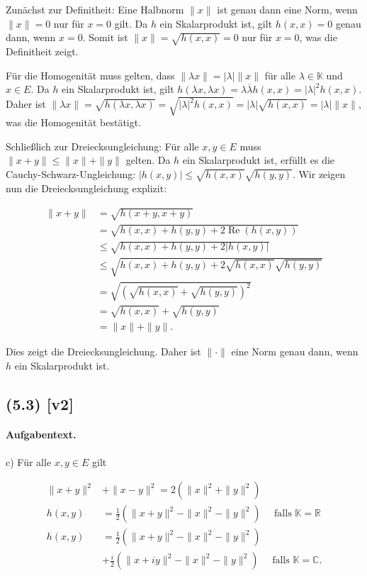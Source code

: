 \documentclass[11pt,a4paper]{article}
\begin{document}
Zunächst zur Definitheit: Eine Halbnorm $\|x\|$ ist genau dann eine Norm, wenn $\|x\| = 0$ nur für $x = 0$ gilt. Da $h$ ein Skalarprodukt ist, gilt $h(x, x) = 0$ genau dann, wenn $x = 0$. Somit ist $\|x\| = \sqrt{h(x, x)} = 0$ nur für $x = 0$, was die Definitheit zeigt.

Für die Homogenität muss gelten, dass $\|\lambda x\| = |\lambda| \|x\|$ für alle $\lambda \in \mathbb{K}$ und $x \in E$. Da $h$ ein Skalarprodukt ist, gilt $h(\lambda x, \lambda x) = \lambda \overline{\lambda} h(x, x) = |\lambda|^2 h(x, x)$. Daher ist $\|\lambda x\| = \sqrt{h(\lambda x, \lambda x)} = \sqrt{|\lambda|^2 h(x, x)} = |\lambda| \sqrt{h(x, x)} = |\lambda| \|x\|$, was die Homogenität bestätigt.

Schließlich zur Dreiecksungleichung: Für alle $x, y \in E$ muss $\|x + y\| \leq \|x\| + \|y\|$ gelten. Da $h$ ein Skalarprodukt ist, erfüllt es die Cauchy-Schwarz-Ungleichung: $|h(x, y)| \leq \sqrt{h(x, x)} \sqrt{h(y, y)}$. Wir zeigen nun die Dreiecksungleichung explizit:

\begin{align*}
\|x+y\| &= \sqrt{h(x+y, x+y)} \\
&= \sqrt{h(x, x) + h(y, y) + 2 \operatorname{Re}(h(x, y))} \\
&\leq \sqrt{h(x, x) + h(y, y) + 2|h(x, y)|} \\
&\leq \sqrt{h(x, x) + h(y, y) + 2\sqrt{h(x, x)}\sqrt{h(y, y)}} \\
&= \sqrt{(\sqrt{h(x, x)} + \sqrt{h(y, y)})^2} \\
&= \sqrt{h(x, x)} + \sqrt{h(y, y)} \\
&= \|x\| + \|y\|.
\end{align*}

Dies zeigt die Dreiecksungleichung. Daher ist $\|\cdot\|$ eine Norm genau dann, wenn $h$ ein Skalarprodukt ist.


\subsection*{(5.3) [v2]}
\paragraph{Aufgabentext.}
c) Für alle $x, y \in E$ gilt

$$
\begin{aligned}
\|x+y\|^2 & +\|x-y\|^2=2\left(\|x\|^2+\|y\|^2\right) \\
h(x, y) & =\frac{1}{2}\left(\|x+y\|^2-\|x\|^2-\|y\|^2\right) \quad \text { falls } \mathbb{K}=\mathbb{R} \\
h(x, y) & =\frac{1}{2}\left(\|x+y\|^2-\|x\|^2-\|y\|^2\right) \\
& +\frac{i}{2}\left(\|x+i y\|^2-\|x\|^2-\|y\|^2\right) \quad \text { falls } \mathbb{K}=\mathbb{C} .
\end{aligned}
$$
\end{document}

